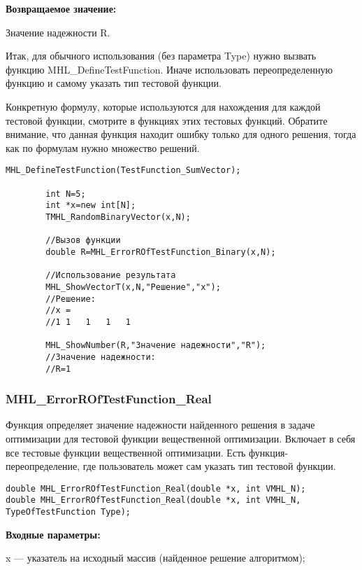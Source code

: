 \documentclass[a4paper,12pt]{article}
\begin{document}
\textbf{Возвращаемое значение:}
 
Значение надежности R.

Итак, для обычного использования (без параметра Type) нужно вызвать функцию MHL\_DefineTestFunction. Иначе использовать переопределенную функцию и самому указать тип тестовой функции.

Конкретную формулу, которые используются для нахождения для каждой тестовой функции, смотрите в функциях этих тестовых функций. Обратите внимание, что данная функция находит ошибку только для одного решения, тогда как по формулам нужно множество решений.


\begin{lstlisting}[label=code_use_MHL_ErrorROfTestFunction_Binary,caption=Пример использования]
        MHL_DefineTestFunction(TestFunction_SumVector);

        int N=5;
        int *x=new int[N];
        TMHL_RandomBinaryVector(x,N);

        //Вызов функции
        double R=MHL_ErrorROfTestFunction_Binary(x,N);

        //Использование результата
        MHL_ShowVectorT(x,N,"Решение","x");
        //Решение:
        //x =
        //1	1	1	1	1

        MHL_ShowNumber(R,"Значение надежности","R");
        //Значение надежности:
        //R=1
\end{lstlisting}

\subsubsection{MHL\_ErrorROfTestFunction\_Real}\label{MHL_ErrorROfTestFunction_Real}

Функция определяет значение надежности найденного решения в задаче оптимизации для тестовой функции вещественной оптимизации. Включает в себя все тестовые функции  вещественной оптимизации. Есть функция-переопределение, где пользователь может сам указать тип тестовой функции.


\begin{lstlisting}[label=code_syntax_MHL_ErrorROfTestFunction_Real,caption=Синтаксис]
double MHL_ErrorROfTestFunction_Real(double *x, int VMHL_N);
double MHL_ErrorROfTestFunction_Real(double *x, int VMHL_N, TypeOfTestFunction Type);
\end{lstlisting}

\textbf{Входные параметры:}

x --- указатель на исходный массив (найденное решение алгоритмом);
\end{document}
